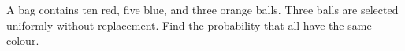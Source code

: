 A bag contains ten red, five blue, and three orange balls. Three balls are selected uniformly without replacement. Find the probability that all have the same colour.
